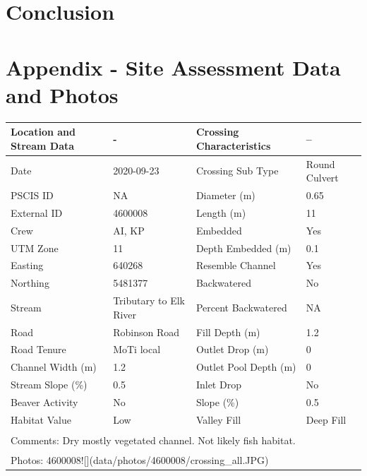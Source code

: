 \documentclass[
]{book}
\begin{document}
\hypertarget{conclusion}{%
\chapter{Conclusion}\label{conclusion}}

\hypertarget{appendix---site-assessment-data-and-photos}{%
\chapter*{Appendix - Site Assessment Data and Photos}\label{appendix---site-assessment-data-and-photos}}

\begin{tabular}{l|l|l|l}
\hline
Location and Stream Data & - & Crossing Characteristics & --\\
\hline
Date & 2020-09-23 & Crossing Sub Type & Round Culvert\\
\hline
PSCIS ID & NA & Diameter (m) & 0.65\\
\hline
External ID & 4600008 & Length (m) & 11\\
\hline
Crew & AI, KP & Embedded & Yes\\
\hline
UTM Zone & 11 & Depth Embedded (m) & 0.1\\
\hline
Easting & 640268 & Resemble Channel & Yes\\
\hline
Northing & 5481377 & Backwatered & No\\
\hline
Stream & Tributary to Elk River & Percent Backwatered & NA\\
\hline
Road & Robinson Road & Fill Depth (m) & 1.2\\
\hline
Road Tenure & MoTi local & Outlet Drop (m) & 0\\
\hline
Channel Width (m) & 1.2 & Outlet Pool Depth (m) & 0\\
\hline
Stream Slope (\%) & 0.5 & Inlet Drop & No\\
\hline
Beaver Activity & No & Slope (\%) & 0.5\\
\hline
Habitat Value & Low & Valley Fill & Deep Fill\\
\hline
\multicolumn{4}{l}{\textsuperscript{} Comments: Dry mostly vegetated channel. Not likely fish habitat.}\\
\multicolumn{4}{l}{\textsuperscript{} Photos: 4600008![](data/photos/4600008/crossing\_all.JPG)}\\
\end{tabular}
\end{document}
